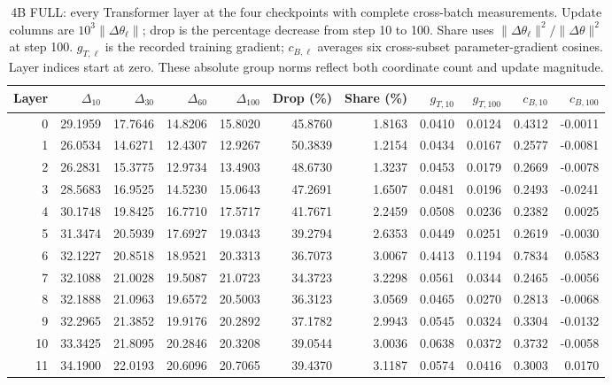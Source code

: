 \begin{table}[!htbp]
\centering
\caption{4B FULL: every Transformer layer at the four checkpoints with complete cross-batch measurements. Update columns are $10^3\|\Delta\theta_\ell\|$; drop is the percentage decrease from step 10 to 100. Share uses $\|\Delta\theta_\ell\|^2/\|\Delta\theta\|^2$ at step 100. $g_{T,\ell}$ is the recorded training gradient; $c_{B,\ell}$ averages six cross-subset parameter-gradient cosines. Layer indices start at zero. These absolute group norms reflect both coordinate count and update magnitude.}
\label{tab:parameter_layers_4b}
\fontsize{8.5}{10.5}\selectfont\setlength{\tabcolsep}{4pt}
\begin{tabular}{rrrrrrrrrrr}
\toprule
Layer & $\Delta_{10}$ & $\Delta_{30}$ & $\Delta_{60}$ & $\Delta_{100}$ & Drop (\%) & Share (\%) & $g_{T,10}$ & $g_{T,100}$ & $c_{B,10}$ & $c_{B,100}$ \\
\midrule
0 & 29.1959 & 17.7646 & 14.8206 & 15.8020 & 45.8760 & 1.8163 & 0.0410 & 0.0124 & 0.4312 & -0.0011 \\
1 & 26.0534 & 14.6271 & 12.4307 & 12.9267 & 50.3839 & 1.2154 & 0.0434 & 0.0167 & 0.2577 & -0.0081 \\
2 & 26.2831 & 15.3775 & 12.9734 & 13.4903 & 48.6730 & 1.3237 & 0.0453 & 0.0179 & 0.2669 & -0.0078 \\
3 & 28.5683 & 16.9525 & 14.5230 & 15.0643 & 47.2691 & 1.6507 & 0.0481 & 0.0196 & 0.2493 & -0.0241 \\
4 & 30.1748 & 19.8425 & 16.7710 & 17.5717 & 41.7671 & 2.2459 & 0.0508 & 0.0236 & 0.2382 & 0.0025 \\
5 & 31.3474 & 20.5939 & 17.6927 & 19.0343 & 39.2794 & 2.6353 & 0.0449 & 0.0251 & 0.2619 & -0.0030 \\
6 & 32.1227 & 20.8518 & 18.9521 & 20.3313 & 36.7073 & 3.0067 & 0.4413 & 0.1194 & 0.7834 & 0.0583 \\
7 & 32.1088 & 21.0028 & 19.5087 & 21.0723 & 34.3723 & 3.2298 & 0.0561 & 0.0344 & 0.2465 & -0.0056 \\
8 & 32.1888 & 21.0963 & 19.6572 & 20.5003 & 36.3123 & 3.0569 & 0.0465 & 0.0270 & 0.2813 & -0.0068 \\
9 & 32.2965 & 21.3852 & 19.9176 & 20.2892 & 37.1782 & 2.9943 & 0.0545 & 0.0324 & 0.3304 & -0.0132 \\
10 & 33.3425 & 21.8095 & 20.2846 & 20.3208 & 39.0544 & 3.0036 & 0.0638 & 0.0372 & 0.3732 & -0.0058 \\
11 & 34.1900 & 22.0193 & 20.6096 & 20.7065 & 39.4370 & 3.1187 & 0.0574 & 0.0416 & 0.3003 & 0.0170 \\

\end{tabular}
\end{table}
